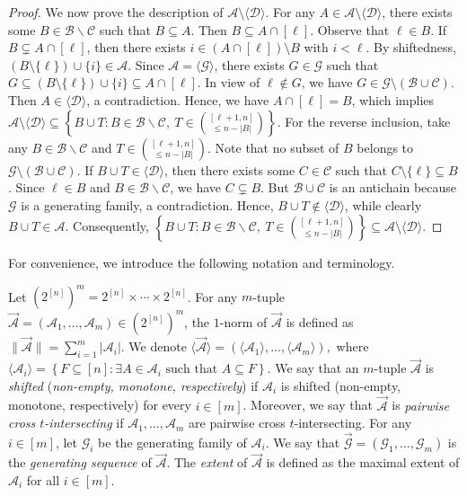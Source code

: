 \documentclass[11pt,a4paper]{article}
\begin{document}
\begin{proof}
We now prove the  description of $\mathcal{A}\setminus\langle\mathcal{D}\rangle$.
For any $A\in\mathcal{A}\setminus\langle\mathcal{D}\rangle$, there exists some $B\in\mathcal{B}\backslash \mathcal{C}$ such that $B\subseteq A$. Then $B\subseteq A\cap[\ell]$.
Observe that $\ell\in B$. 
If $B\subsetneq A\cap[\ell]$, then there exists $i\in(A\cap[\ell])\setminus B$ with $i<\ell$.
By shiftedness, $(B\setminus\{\ell\})\cup\{i\}\in\mathcal{A}$. Since 
$\mathcal{A}= \langle\mathcal{G}\rangle$, there exists $G\in\mathcal{G}$ such that $G\subseteq(B\setminus\{\ell\})\cup\{i\}\subseteq A\cap[\ell]$.
In view of $\ell \notin G$, we have $G\in\mathcal{G}\setminus(\mathcal{B}\cup\mathcal{C})$.
Then $A\in\langle\mathcal{D}\rangle$, a contradiction. Hence, we have $A\cap[\ell]=B$, which implies 
$\mathcal{A}\setminus\langle\mathcal{D}\rangle\subseteq\left\{B\cup T: B\in\mathcal{B}\backslash \mathcal{C},\ T\in\binom{[\ell+1,n]}{\leq n-|B|}\right\}$.
For the reverse inclusion, take any  $B\in\mathcal{B}\backslash \mathcal{C}$ and $ T\in\binom{[\ell+1,n]}{\leq n-|B|}$. Note that no subset of $B$ belongs to $\mathcal{G}\setminus(\mathcal{B}\cup  \mathcal{C})$.
If  $B\cup T \in \langle\mathcal{D}\rangle$, then there exists some  
$C\in\mathcal{C}$ such that $C\setminus\{\ell\}\subseteq B$.
Since $\ell\in B$ and $B\in\mathcal{B}\backslash \mathcal{C}$, we  have $C\subsetneq B$. 
But $\mathcal{B}\cup\mathcal{C}$ is an antichain because $\mathcal{G}$ is a  generating family, a contradiction.
Hence, $B\cup T \notin \langle\mathcal{D}\rangle$, while clearly $B\cup T \in \mathcal{A}$. Consequently,
$\left\{B\cup T: B\in\mathcal{B}\backslash \mathcal{C},\ T\in\binom{[\ell+1,n]}{\leq n-|B|}\right\}\subseteq\mathcal{A}\setminus\langle\mathcal{D}\rangle$.
\end{proof}


For convenience, we introduce the following notation and terminology.

Let $(2^{[n]})^{m} = 2^{[n]} \times \cdots \times 2^{[n]}$. For any $m$-tuple \(\vec{\mathcal{A}} = (\mathcal{A}_1, \ldots, \mathcal{A}_m) \in (2^{[n]})^{m} \),  the $1$-norm of $\vec{\mathcal{A}}$ is defined as  $\|\vec{\mathcal{A}}\| = \sum_{i=1}^{m} |\mathcal{A}_i|$.  We denote $\langle\vec{\mathcal{A}}\rangle=(\langle\mathcal{A}_1\rangle, \ldots, \langle\mathcal{A}_m\rangle),$ where $
\langle\mathcal{A}_i\rangle=\left\{F\subseteq [n]: \exists A \in\mathcal{A}_i\text{ such that }A\subseteq F\right\}.
$
We say that an $m$-tuple \( \vec{\mathcal{A}} \) is \textit{shifted} (\textit{non-empty, monotone, respectively}) if \( \mathcal{A}_i \) is shifted (non-empty, monotone, respectively) for every $i\in [m]$.   Moreover, we say that \( \vec{\mathcal{A}} \) is \textit{  pairwise cross $t$-intersecting} if $\mathcal{A}_1, \ldots, \mathcal{A}_m$ are  pairwise cross $t$-intersecting.
For any $i\in [m]$,
let $\mathcal{G}_i$ be the generating family of $\mathcal{A}_i$.
We say that $\vec{\mathcal{G}} = (\mathcal{G}_1, \ldots, \mathcal{G}_m)$ is the \textit{generating sequence} of $\vec{\mathcal{A}}$. 
The \textit{extent} of $\vec{\mathcal{A}}$ is defined as the maximal extent of $\mathcal{A}_i$ for all $i\in[m]$.
\end{document}
